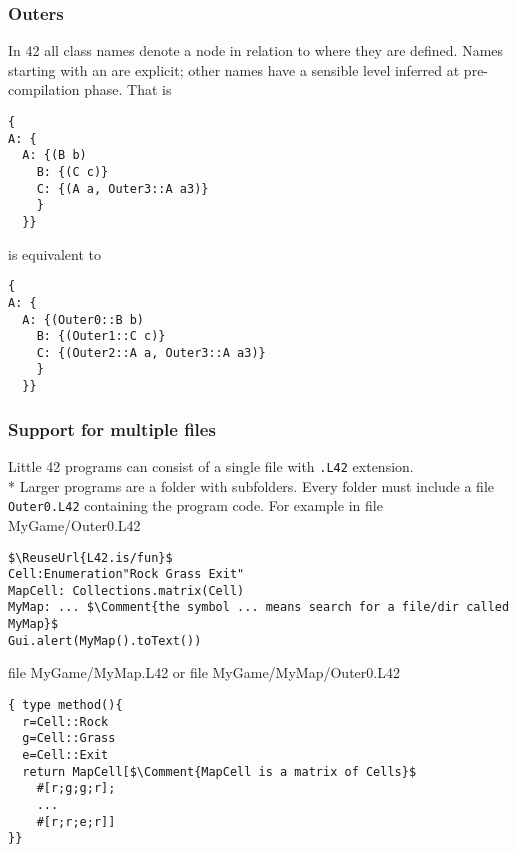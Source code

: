 \begin{frame}[fragile]
\frametitle{Outers}
In 42 all class names denote a node in relation 
to where they are defined.
Names starting with an \Q@Outer@ are explicit;
other names have a sensible \Q@Outer@ level inferred at pre-compilation phase. That is

\begin{NiceCode}{59ex}{0.8}
\begin{lstlisting}
{
A: {
  A: {(B b)
    B: {(C c)}
    C: {(A a, Outer3::A a3)}
    }
  }}
\end{lstlisting}
\end{NiceCode}

is equivalent to 

\begin{NiceCode}{59ex}{0.8}
\begin{lstlisting}
{
A: {
  A: {(Outer0::B b)
    B: {(Outer1::C c)}
    C: {(Outer2::A a, Outer3::A a3)}
    }
  }}
\end{lstlisting}
\end{NiceCode}
\end{frame}



\begin{frame}[fragile]
\frametitle{Support for multiple files}
Little 42 programs can consist of a single file with \texttt{.L42}
extension.\\*
Larger programs are a folder with subfolders.
Every folder must include a file \texttt{Outer0.L42}
containing the program code.
For example in 
file MyGame/Outer0.L42
\begin{NiceCode}{59ex}{0.8}
\begin{lstlisting}
$\ReuseUrl{L42.is/fun}$
Cell:Enumeration"Rock Grass Exit"
MapCell: Collections.matrix(Cell)
MyMap: ... $\Comment{the symbol ... means search for a file/dir called MyMap}$
Gui.alert(MyMap().toText())
\end{lstlisting}
\end{NiceCode}

file MyGame/MyMap.L42 or file MyGame/MyMap/Outer0.L42
\begin{NiceCode}{59ex}{0.8}
\begin{lstlisting}
{ type method(){
  r=Cell::Rock
  g=Cell::Grass
  e=Cell::Exit
  return MapCell[$\Comment{MapCell is a matrix of Cells}$
    #[r;g;g;r];
    ...
    #[r;r;e;r]]
}}
\end{lstlisting}
\end{NiceCode}
\end{frame}


